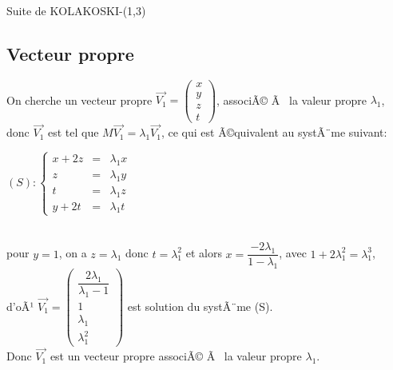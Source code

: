 \documentclass[12pt,a4paper,oneside]{book}
\begin{document}
\begin{titlepage}
\begin{chapter}{Suite de KOLAKOSKI-(1,3)}
\subsection{Vecteur propre}
On cherche un vecteur propre $\overrightarrow{V_1}=\left( \begin{array}{c}
x \\ 
y \\ 
z \\ 
t
\end{array} \right)$, associÃ© Ã  la valeur propre  $\lambda_1$,\\
 donc $\overrightarrow{V_1}$ est tel que $M\overrightarrow{V_1}=\lambda_1\overrightarrow{V_1}$, ce qui est Ã©quivalent au systÃ¨me suivant: \\
\begin{center}
$(S): \left\{ \begin{array}{rcl}
x+2z & = & \lambda_1 x \\
z & = & \lambda_1 y \\
t & = & \lambda_1 z \\
y+2t&= & \lambda_1 t
\end{array} $
\end{center}\\
pour $y =1$, on a $z=\lambda_1$ donc $t=\lambda_1^2$ et alors $x=\dfrac{-2\lambda_1}{1-\lambda_1}$, avec $1+2\lambda_1^2=\lambda_1^3$,\\
 d'oÃ¹ $\overrightarrow{V_1}=\left(\begin{array}{c}
\dfrac{2\lambda_1}{\lambda_1-1} \\ 
1 \\ 
 \lambda_1\\ 
\lambda_1^2
\end{array} \right)$ est solution du systÃ¨me (S).\\
 Donc $\overrightarrow{V_1}$ est un vecteur propre associÃ© Ã  la valeur propre $\lambda_1$.

\end{chapter}
\end{titlepage}
\end{document}
